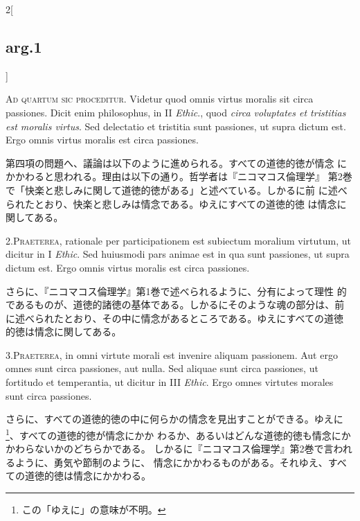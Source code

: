 \documentclass[paper=a4paper,fontsize=10pt,jafontsize=9pt,titlepage]{jlreq}
\begin{document}
\begin{paracol}{2}[\subsection{arg.1}]

{\scshape Ad quartum sic proceditur}. Videtur quod omnis virtus
moralis sit circa passiones. Dicit enim philosophus, in II {\itshape
Ethic}., quod {\itshape circa voluptates et tristitias est moralis
virtus}. Sed delectatio et tristitia sunt passiones, ut supra dictum
est. Ergo omnis virtus moralis est circa passiones.

\switchcolumn

第四項の問題へ、議論は以下のように進められる。すべての道徳的徳が情念
 にかかわると思われる。理由は以下の通り。哲学者は『ニコマコス倫理学』
 第2巻で「快楽と悲しみに関して道徳的徳がある」と述べている。しかるに前
 に述べられたとおり、快楽と悲しみは情念である。ゆえにすべての道徳的徳
 は情念に関してある。


2.{\scshape Praeterea}, rationale per participationem est subiectum
moralium virtutum, ut dicitur in I {\itshape Ethic}. Sed huiusmodi
pars animae est in qua sunt passiones, ut supra dictum est. Ergo omnis
virtus moralis est circa passiones.

\switchcolumn

さらに、『ニコマコス倫理学』第1巻で述べられるように、分有によって理性
的であるものが、道徳的諸徳の基体である。しかるにそのような魂の部分は、前
に述べられたとおり、その中に情念があるところである。ゆえにすべての道徳
的徳は情念に関してある。


3.{\scshape Praeterea}, in omni virtute morali est invenire aliquam
passionem. Aut ergo omnes sunt circa passiones, aut nulla. Sed aliquae
sunt circa passiones, ut fortitudo et temperantia, ut dicitur in III
{\itshape Ethic}. Ergo omnes virtutes morales sunt circa passiones.

\switchcolumn

さらに、すべての道徳的徳の中に何らかの情念を見出すことができる。ゆえに
\footnote{この「ゆえに」の意味が不明。}、すべての道徳的徳が情念にかか
わるか、あるいはどんな道徳的徳も情念にかかわらないかのどちらかである。
しかるに『ニコマコス倫理学』第2巻で言われるように、勇気や節制のように、
情念にかかわるものがある。それゆえ、すべての道徳的徳は情念にかかわる。


\end{paracol}
\end{document}

